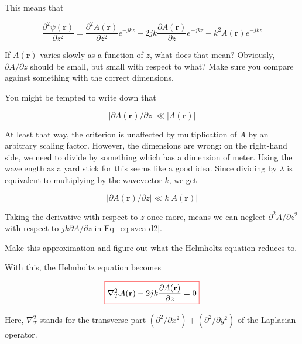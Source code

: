 This means that

\begin{equation}
  \frac{\partial^2 \psi({\mathbf r})}{\partial z^2} = \frac{\partial^2 A({\mathbf r})}{\partial z^2}e^{-jkz} - 2 j k \frac{\partial A({\mathbf r})}{\partial z}e^{-jkz} - k^2 A({\mathbf r})e^{-jkz}
 \label{eq-svea-d2} 
\end{equation} 

\begin{cue}
If $A({\mathbf r})$ varies slowly as a function of $z$, what does that mean? Obviously, $\partial A / \partial z$ should be small, but small with respect to what? Make sure you compare against something with the correct dimensions.
\end{cue}

You might be tempted to write down that

\begin{equation}
 \left|\partial A({\mathbf r}) / \partial z\right| \ll \left|A({\mathbf r})\right|
\end{equation} 

At least that way, the criterion is unaffected by multiplication of $A$ by an arbitrary scaling factor. However, the dimensions are wrong: on the right-hand side, we need to divide by something which has a dimension of meter. Using the wavelength as a yard stick for this seems like a good idea. Since dividing by $\lambda$ is equivalent to multiplying by the wavevector $k$, we get

\begin{equation}
\left|\partial A({\mathbf r}) / \partial z\right| \ll k \left|A({\mathbf r})\right|
\end{equation}

Taking the derivative with respect to $z$ once more, means we can neglect $\partial^2 A / \partial z^2$ with respect to $j k \partial A / \partial z$ in Eq~\ref{eq-svea-d2}.

\begin{cue}
Make this approximation and figure out what the Helmholtz equation reduces to.
\end{cue}

With this, the Helmholtz equation becomes

\begin{equation}
\fbox{$\displaystyle
\nabla_T^2 A({\mathbf r}) -2jk \frac{\partial A({\mathbf r})}{\partial z} = 0
$}
\label{eq-paraxial}
\end{equation} 

Here, $\nabla_T^2$ stands for the transverse part $(\partial^2 / \partial x^2) + (\partial^2 / \partial y^2)$ of the Laplacian operator.

